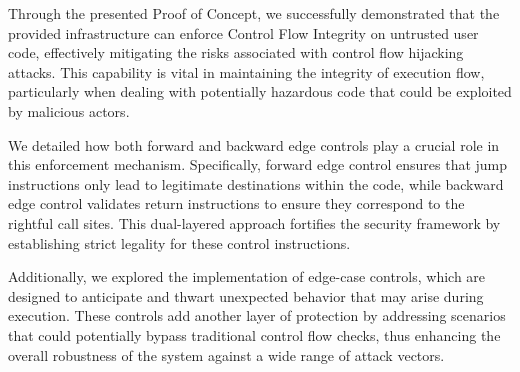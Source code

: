 Through the presented Proof of Concept, we successfully demonstrated that the
provided infrastructure can enforce Control Flow Integrity on untrusted user
code, effectively mitigating the risks associated with control flow hijacking attacks.
This capability is vital in maintaining the integrity of execution flow, particularly
when dealing with potentially hazardous code that could be exploited by malicious
actors.

We detailed how both forward and backward edge controls play a crucial role in this
enforcement mechanism. Specifically, forward edge control ensures that jump instructions
only lead to legitimate destinations within the code, while backward edge
control validates return instructions to ensure they correspond to the rightful
call sites. This dual-layered approach fortifies the security framework by establishing
strict legality for these control instructions.

Additionally, we explored the implementation of edge-case controls, which are designed
to anticipate and thwart unexpected behavior that may arise during execution.
These controls add another layer of protection by addressing scenarios that
could potentially bypass traditional control flow checks, thus enhancing the overall
robustness of the system against a wide range of attack vectors.
